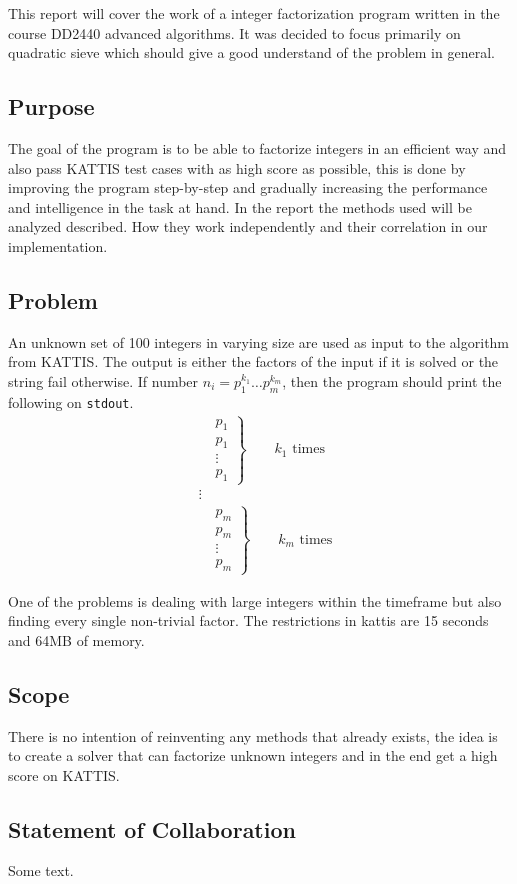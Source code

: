 This report will cover the work of a integer factorization program written in the course DD2440 advanced algorithms. It was decided to focus primarily on quadratic sieve which should give a good understand of the problem in general.

\subsection{Purpose}
The goal of the program is to be able to factorize integers in an efficient way and also pass KATTIS test cases with as high score as possible, this is done by improving the program step-by-step and gradually increasing the performance and intelligence in the task at hand. In the report the methods used will be analyzed described. How they work independently and their correlation in our implementation.

\subsection{Problem}
An unknown set of 100 integers in varying size are used as input to the algorithm from KATTIS. The output is either the factors of the input if it is solved or the string fail otherwise. If number $n_i = p_1^{k_1} \ldots p_m^{k_m}$, then the program should print the following on \texttt{stdout}.
\begin{align*}
&\left.\begin{aligned}
      &p_1 \\
      &p_1 \\
      &\vdots \\
      &p_1 
      \end{aligned}
\right\}
\qquad k_1 \text{ times} \\
&\vdots \\
&\left.\begin{aligned}
      &p_m \\
      &p_m \\
      &\vdots \\
      &p_m 
      \end{aligned}
\right\}
\qquad k_m \text{ times}
\end{align*}

One of the problems is dealing with large integers within the timeframe but also finding every single non-trivial factor. The restrictions in kattis are 15 seconds and 64MB of memory.
\subsection{Scope}
There is no intention of reinventing any methods that already exists, the idea is to create a solver that can factorize unknown integers and in the end get a high score on KATTIS.

\subsection{Statement of Collaboration}
Some text.